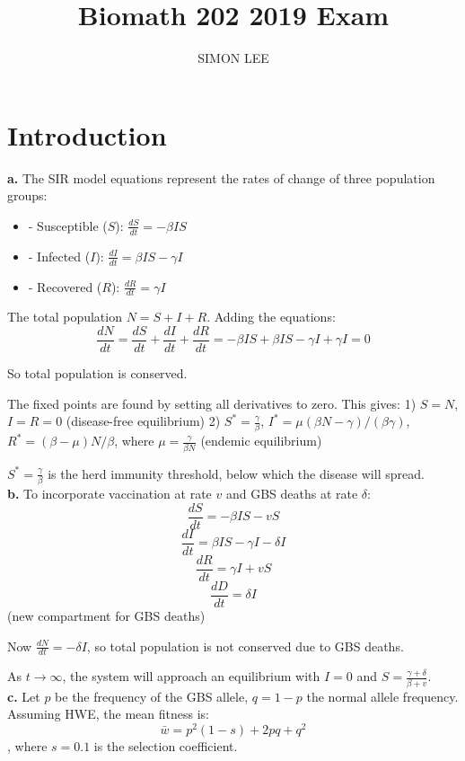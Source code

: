 \documentclass{article}
\title{Biomath 202 2019 Exam}
\author{SIMON LEE}
\date{}
\begin{document}
\maketitle

\section{Introduction}

\textbf{a.} The SIR model equations represent the rates of change of three population groups:
\begin{itemize}
    \item - Susceptible (\(S\)): \(\frac{dS}{dt} = -\beta IS\)
    \item - Infected (\(I\)): \(\frac{dI}{dt} = \beta IS - \gamma I\)
    \item - Recovered (\(R\)): \(\frac{dR}{dt} = \gamma I\)
\end{itemize}

The total population \(N = S + I + R\). Adding the equations:
\[\frac{dN}{dt} = \frac{dS}{dt} + \frac{dI}{dt} + \frac{dR}{dt} = -\beta IS + \beta IS - \gamma I + \gamma I = 0\]

So total population is conserved.

The fixed points are found by setting all derivatives to zero. This gives:
1) \(S = N\), \(I = R = 0\) (disease-free equilibrium)  
2) \(S^* = \frac{\gamma}{\beta}\), \(I^* = \mu(\beta N - \gamma)/(\beta\gamma)\), \(R^* = (\beta-\mu)N/\beta\), where \(\mu = \frac{\gamma}{\beta N}\) (endemic equilibrium)

\(S^* = \frac{\gamma}{\beta}\) is the herd immunity threshold, below which the disease will spread.\\

\textbf{b.} To incorporate vaccination at rate \(v\) and GBS deaths at rate \(\delta\):
\[\frac{dS}{dt} = -\beta IS - vS\]
\[\frac{dI}{dt} = \beta IS - \gamma I - \delta I\]  
\[\frac{dR}{dt} = \gamma I + vS\]
\[\frac{dD}{dt} = \delta I\]  (new compartment for GBS deaths)

Now \(\frac{dN}{dt} = -\delta I\), so total population is not conserved due to GBS deaths.

As \(t \rightarrow \infty\), the system will approach an equilibrium with \(I = 0\) and \(S = \frac{\gamma+\delta}{\beta+v}\).\\

\textbf{c.} Let \(p\) be the frequency of the GBS allele, \(q=1-p\) the normal allele frequency. Assuming HWE, the mean fitness is:
\[\bar{w} = p^2 (1-s) + 2pq + q^2\], where \(s=0.1\) is the selection coefficient.  
\end{document}
